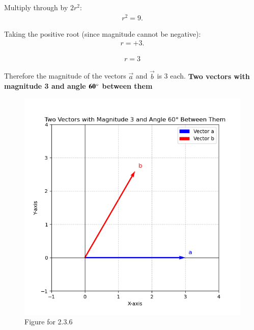 \documentclass[journal]{IEEEtran}
\begin{document}
Multiply through by $2r^2$:
\begin{align}
r^2 = 9.
\end{align}

Taking the positive root (since magnitude cannot be negative):
\begin{align}
r = +3.
\end{align}

\begin{align}
r = 3
\end{align}



Therefore the magnitude of the vectors $\vec{a}$ and $\vec{b}$ is 3 each.
\newpage
\textbf{Two vectors with magnitude 3 and angle $\mathbf{60\degree}$ between them}
\begin{figure}[H]
    \centering
    \includegraphics[width=1.1\columnwidth]{figs/fig1.png}
    \caption{Figure for 2.3.6}
    \label{fig1}
\end{figure}
\end{document}
